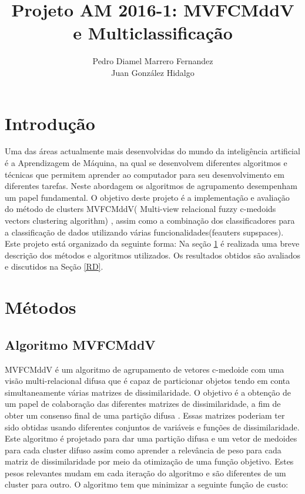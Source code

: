\documentclass[12pt]{article}
\author{Pedro Diamel Marrero Fernandez \\ Juan González Hidalgo}
\title{Projeto AM 2016-1: MVFCMddV e Multiclassificação}
\begin{document}
\maketitle



\section*{Introdução}

Uma das áreas actualmente mais desenvolvidas do mundo da inteligência artificial é a Aprendizagem de Máquina, na qual se desenvolvem diferentes algoritmos e técnicas que permitem aprender ao computador para seu desenvolvimento em diferentes tarefas. Neste abordagem os algoritmos de agrupamento desempenham um papel fundamental. O objetivo deste projeto é a implementação e avaliação do método de clusters MVFCMddV( Multi-view relacional fuzzy c-medoids vectors clustering algorithm) \cite{de2015multi}, assim como a combinação dos classificadores para a classificação de dados utilizando várias funcionalidades(feauters supspaces). Este projeto está organizado da seguinte forma: Na seção \ref{MET} é realizada uma breve descrição dos métodos e algoritmos utilizados. Os resultados obtidos são avaliados e discutidos na Seção \ref{RD}.

\section{Métodos}\label{MET}

\subsection{Algoritmo MVFCMddV}

MVFCMddV é um algoritmo de agrupamento de vetores c-medoide com uma visão multi-relacional difusa que é capaz de particionar objetos tendo em conta simultaneamente várias matrizes de dissimilaridade. O objetivo é a obtenção de um papel de colaboração das diferentes matrizes de dissimilaridade, a fim de obter um consenso final de uma partição difusa \cite{de2015multi}.
Essas matrizes poderiam ter sido obtidas usando diferentes conjuntos de variáveis e funções de dissimilaridade. Este algoritmo é projetado para dar uma partição difusa e um vetor de medoides para cada cluster difuso assim como aprender a relevância de peso para cada matriz de dissimilaridade por meio da otimização de uma função objetivo. Estes pesos relevantes mudam em cada iteração do algoritmo e são diferentes de um cluster para outro. O algoritmo tem que minimizar a seguinte função de custo:
 
\end{document}

